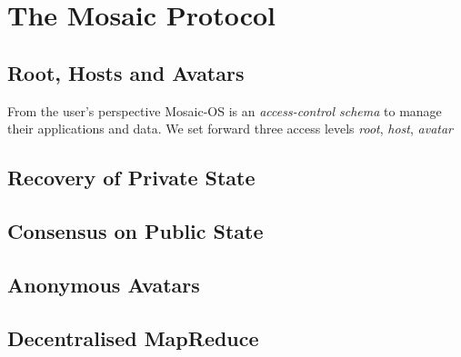 \documentclass[twoside,twocolumn]{article}
\begin{document}

\section{The Mosaic Protocol}

\subsection{Root, Hosts and Avatars}

From the user's perspective Mosaic-OS is an \emph{access-control schema} to manage their applications and data.
We set forward three access levels \emph{root}, \emph{host}, \emph{avatar}

\subsection{Recovery of Private State}

\subsection{Consensus on Public State}

\subsection{Anonymous Avatars}

\subsection{Decentralised MapReduce}



\theendnotes


\begin{thebibliography}{99} %

 
\end{thebibliography}

\end{document}
